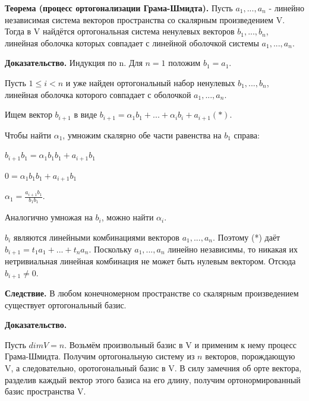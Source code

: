 \documentclass[a4paper]{article}
\begin{document}
    \begin{htheorem}
        \textbf{Теорема (процесс ортогонализации Грама-Шмидта).} Пусть $a_1, ..., a_n$ - линейно независимая система векторов пространства со скалярным произведением V. Тогда в V найдётся ортогональная система ненулевых векторов $b_1, ..., b_n$, линейная оболочка которых совпадает с линейной оболочкой системы $a_1, ..., a_n$.
    \end{htheorem}

    \begin{hproof}
        \textbf{Доказательство.}
        Индукция по n. Для $n=1$ положим $b_1=a_1$.

        Пусть $1 \leq i < n$ и уже найден ортогональный набор ненулевых $b_1, ..., b_n$, линейная оболочка которого совпадает с оболочкой $a_1, ..., a_n$.

        Ищем вектор $b_{i+1}$ в виде $b_{i+1} = \alpha_1 b_1 + ... + \alpha_i b_i + a_{i+1} (*)$.

        Чтобы найти $\alpha_1$, умножим скалярно обе части равенства на $b_1$ справа:

        $b_{i+1} b_1 = \alpha_1 b_1 b_1 + a_{i+1} b_1$

        $0 = \alpha_1 b_1 b_1 + a_{i+1} b_1$

        $\displaystyle \alpha_1 = \frac{a_{i+1}b_1}{b_1b_1}$.

        Аналогично умножая на $b_i$, можно найти $\alpha_i$.

        $b_i$ являются линейными комбинациями векторов $a_1, ..., a_n$. Поэтому (*) даёт $b_{i+1} = t_1a_1 + ... + t_na_n$. Поскольку $a_1, ..., a_n$ линейно независимы, то никакая их нетривиальная линейная комбинация не может быть нулевым вектором. Отсюда $b_{i+1} \neq 0$.
    \end{hproof}

    \begin{htheorem}
        \textbf{Следствие.} В любом конечномерном пространстве со скалярным произведением существует ортогональный базис.
    \end{htheorem}

    \begin{hproof}
        \textbf{Доказательство.}

        Пусть $dimV = n$. Возьмём произвольный базис в V и применим к нему процесс Грама-Шмидта. Получим ортогональную систему из $n$ векторов, порождающую V, а следовательно, оротогональный базис в V. В силу замечния об орте вектора, разделив каждый вектор этого базиса на его длину, получим ортонормированный базис пространства V.
    \end{hproof}
\end{document}

